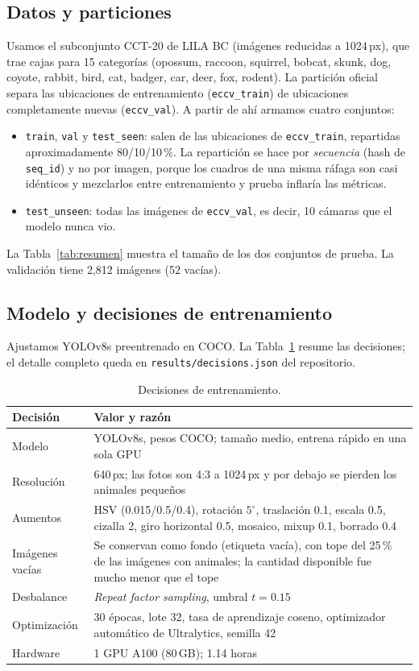 \documentclass[10pt,letterpaper]{article}
\begin{document}
\subsection{Datos y particiones}
Usamos el subconjunto CCT-20 de LILA BC (imágenes reducidas a 1024\,px), que trae cajas para 15 categorías (opossum, raccoon, squirrel, bobcat, skunk, dog, coyote,
rabbit, bird, cat, badger, car, deer, fox, rodent). La partición oficial separa las ubicaciones de entrenamiento (\texttt{eccv\_train}) de ubicaciones completamente
nuevas (\texttt{eccv\_val}). A partir de ahí armamos cuatro conjuntos:

\begin{itemize}
  \item \texttt{train}, \texttt{val} y \texttt{test\_seen}: salen de las ubicaciones de \texttt{eccv\_train}, repartidas aproximadamente 80/10/10\,\%. La repartición se hace
  por \emph{secuencia} (hash de \texttt{seq\_id}) y no por imagen, porque los cuadros de una misma ráfaga son casi idénticos y mezclarlos entre entrenamiento y prueba
  inflaría las métricas.
  \item \texttt{test\_unseen}: todas las imágenes de \texttt{eccv\_val}, es decir, 10 cámaras que el modelo nunca vio.
\end{itemize}

La Tabla~\ref{tab:resumen} muestra el tamaño de los dos conjuntos de prueba. La validación tiene 2,812 imágenes (52 vacías).

\subsection{Modelo y decisiones de entrenamiento}
Ajustamos YOLOv8s preentrenado en COCO. La Tabla~\ref{tab:decisiones} resume las decisiones; el detalle completo queda en \texttt{results/decisions.json} del repositorio.

\begin{table}[H]
\centering\small
\caption{Decisiones de entrenamiento.}\label{tab:decisiones}
\begin{tabular}{|l|p{8.2cm}|}
\hline
Decisión & Valor y razón \\ \hline
Modelo & YOLOv8s, pesos COCO; tamaño medio, entrena rápido en una sola GPU \\
Resolución & 640\,px; las fotos son 4:3 a 1024\,px y por debajo se pierden los animales pequeños \\
Aumentos & HSV (0.015/0.5/0.4), rotación $5^\circ$, traslación 0.1, escala 0.5, cizalla 2, giro horizontal 0.5, mosaico, mixup 0.1, borrado 0.4 \\
Imágenes vacías & Se conservan como fondo (etiqueta vacía), con tope del 25\,\% de las imágenes con animales; la cantidad disponible fue mucho menor que el tope \\
Desbalance & \emph{Repeat factor sampling}, umbral $t=0.15$ \\
Optimización & 30 épocas, lote 32, tasa de aprendizaje coseno, optimizador automático de Ultralytics, semilla 42 \\
Hardware & 1 GPU A100 (80\,GB); 1.14 horas \\ \hline
\end{tabular}
\end{table}
\end{document}
